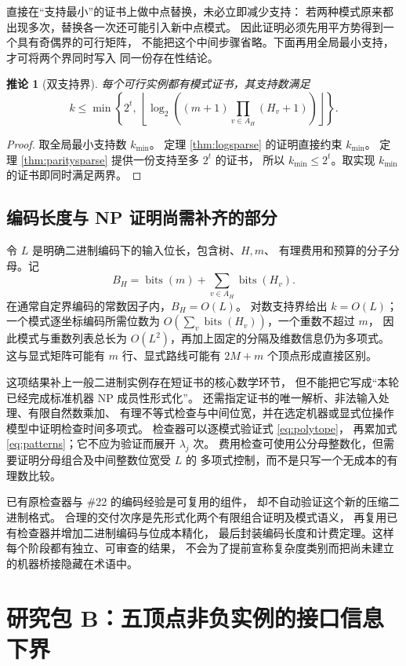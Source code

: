 \documentclass[UTF8,a4paper,11pt,fontset=fandol]{ctexart}
\newtheorem{corollary}[theorem]{推论}
\theoremstyle{definition}
\newcommand{\bits}{\operatorname{bits}}
\begin{document}
直接在“支持最小”的证书上做中点替换，未必立即减少支持：
若两种模式原来都出现多次，替换各一次还可能引入新中点模式。
因此证明必须先用平方势得到一个具有奇偶界的可行矩阵，
不能把这个中间步骤省略。下面再用全局最小支持，才可将两个界同时写入
同一份存在性结论。

\begin{corollary}[双支持界]\label{cor:both}
每个可行实例都有模式证书，其支持数满足
\[
k\le
\min\left\{
2^t,\
\left\lfloor\log_2\left((m+1)
\prod_{v\in A_H}(H_v+1)\right)\right\rfloor
\right\}.
\]
\end{corollary}
\begin{proof}
取全局最小支持数 $k_{\min}$。
定理 \ref{thm:logsparse} 的证明直接约束 $k_{\min}$。
定理 \ref{thm:paritysparse} 提供一份支持至多 $2^t$ 的证书，
所以 $k_{\min}\le2^t$。取实现 $k_{\min}$ 的证书即同时满足两界。
\end{proof}

\subsection{编码长度与 NP 证明尚需补齐的部分}

令 $L$ 是明确二进制编码下的输入位长，包含树、$H,m$、
有理费用和预算的分子分母。记
\[
B_H=\bits(m)+\sum_{v\in A_H}\bits(H_v).
\]
在通常自定界编码的常数因子内，$B_H=O(L)$。
对数支持界给出 $k=O(L)$；一个模式逐坐标编码所需位数为
$O(\sum_v\bits(H_v))$，一个重数不超过 $m$，
因此模式与重数列表总长为 $O(L^2)$，再加上固定的分隔及维数信息仍为多项式。
这与显式矩阵可能有 $m$ 行、显式路线可能有 $2M+m$ 个顶点形成直接区别。

这项结果补上一般二进制实例存在短证书的核心数学环节，
但不能把它写成“本轮已经完成标准机器 NP 成员性形式化”。
还需指定证书的唯一解析、非法输入处理、有限自然数乘加、
有理不等式检查与中间位宽，并在选定机器或显式位操作模型中证明检查时间多项式。
检查器可以逐模式验证式 \eqref{eq:polytope}，
再累加式 \eqref{eq:patterns}；它不应为验证而展开 $\lambda_j$ 次。
费用检查可使用公分母整数化，但需要证明分母组合及中间整数位宽受 $L$ 的
多项式控制，而不是只写一个无成本的有理数比较。

已有原检查器与 \#22 的编码经验是可复用的组件，
却不自动验证这个新的压缩二进制格式。
合理的交付次序是先形式化两个有限组合证明及模式语义，
再复用已有检查器并增加二进制编码与位成本精化，
最后封装编码长度和计费定理。这样每个阶段都有独立、可审查的结果，
不会为了提前宣称复杂度类别而把尚未建立的机器桥接隐藏在术语中。

\section{研究包 B：五顶点非负实例的接口信息下界}\label{sec:interface}
\end{document}
